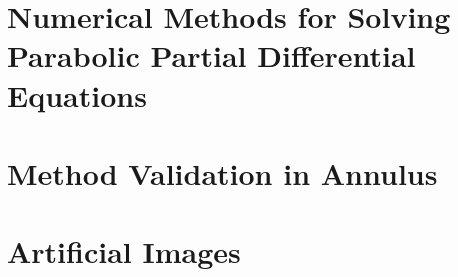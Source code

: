 \documentclass{uofsthesis-cs}
\begin{document}
  \begin{appendices}
    
    \chapter{Numerical Methods for Solving Parabolic Partial Differential Equations}
      

    \chapter{Method Validation in Annulus}
      

    \chapter{Artificial Images}
      

    
  \end{appendices}
  
  



\end{document}
